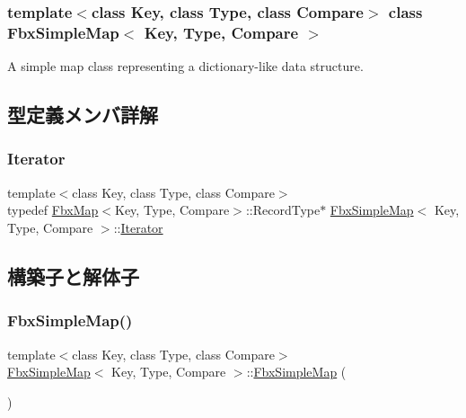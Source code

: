 \subsubsection*{template$<$class Key, class Type, class Compare$>$\newline
class Fbx\+Simple\+Map$<$ Key, Type, Compare $>$}

A simple map class representing a dictionary-\/like data structure. 

\subsection{型定義メンバ詳解}
\mbox{\label{class_fbx_simple_map_aaa589eb5e1ccdd11dffd018f3212e13e}} 
\subsubsection{\texorpdfstring{Iterator}{Iterator}}
{\footnotesize\ttfamily template$<$class Key, class Type, class Compare$>$ \\
typedef \hyperlink{class_fbx_map}{Fbx\+Map}$<$Key, Type, Compare$>$\+::Record\+Type$\ast$ \hyperlink{class_fbx_simple_map}{Fbx\+Simple\+Map}$<$ Key, Type, Compare $>$\+::\hyperlink{class_fbx_simple_map_aaa589eb5e1ccdd11dffd018f3212e13e}{Iterator}}



\subsection{構築子と解体子}
\mbox{\label{class_fbx_simple_map_a3e89743411abd2e67f84e942787d4a84}} 
\subsubsection{\texorpdfstring{Fbx\+Simple\+Map()}{FbxSimpleMap()}}
{\footnotesize\ttfamily template$<$class Key, class Type, class Compare$>$ \\
\hyperlink{class_fbx_simple_map}{Fbx\+Simple\+Map}$<$ Key, Type, Compare $>$\+::\hyperlink{class_fbx_simple_map}{Fbx\+Simple\+Map} (\begin{DoxyParamCaption}{ }\end{DoxyParamCaption})}



